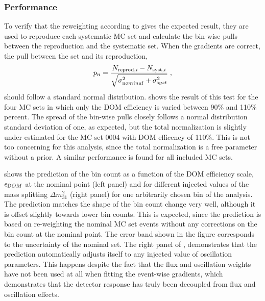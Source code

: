 \subsubsection{Performance}
To verify that the reweighting according to  gives the expected result, they are used to reproduce each systematic MC set and calculate the bin-wise pulls between the reproduction and the systematic set. When the gradients are correct, the pull between the set and its reproduction,
$$p_n = \frac{N_{\mathrm{reprod}, i} - N_{\mathrm{syst}, i}}{\sqrt{\sigma^2_{\rm nominal} + \sigma^2_{\rm syst}}}\;,$$
should follow a standard normal distribution.  shows the result of this test for the four MC sets in which only the DOM efficiency is varied between 90\% and 110\% percent. The spread of the bin-wise pulls closely follows a normal distribution standard deviation of one, as expected, but the total normalization is slightly under-estimated for the MC set 0004 with DOM efficency of 110\%. This is not too concerning for this analysis, since the total normalization is a free parameter without a prior. A similar performance is found for all included MC sets.

 shows the prediction of the bin count as a function of the DOM efficiency scale, $\epsilon_{\rm DOM}$ at the nominal point (left panel) and for different injected values of the mass splitting $\Delta m^2_{31}$ (right panel) for one arbitrarily chosen bin of the analysis. The prediction matches the shape of the bin count change very well, although it is offset slightly towards lower bin counts. This is expected, since the prediction is based on re-weighting the nominal MC set events without any corrections on the bin count at the nominal point. The error band shown in the figure corresponds to the uncertainty of the nominal set. The right panel of , demonstrates that the prediction automatically adjusts itself to any injected value of oscillation parameters. This happens despite the fact that the flux and oscillation weights have not been used at all when fitting the event-wise gradients, which demonstrates that the detector response has truly been decoupled from flux and oscillation effects.

